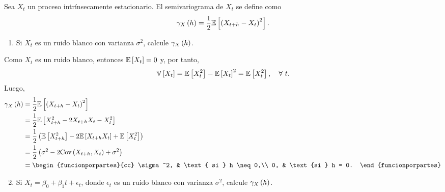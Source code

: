 \documentclass[../main.tex]{subfiles}
\begin{document}
    \begin{enunciado}
    	Sea $X_t$ un proceso intrínsecamente estacionario. El semivariograma de $X_t$ se define como
            \begin{align*}
            	\gamma_X\left( h \right) = \frac 1 2 \mathbb{E} \left[ \left( X_{t+h} - X_t \right)^2 \right].
            \end{align*}
        \begin{enumerate}
        	\item Si $X_t$ es un ruido blanco con varianza $\sigma^2$, calcule $\gamma_X\left( h \right)$.
        \end{enumerate}
    \end{enunciado}
    
    \begin{demostracion}
        Como $X_t$ es un ruido blanco, entonces $\mathbb{E} \left[ X_t \right] = 0$ y, por tanto,
            \begin{align*}
            	\mathbb{V} \left[ X_t \right] = \mathbb{E} \left[ X_t^2 \right] - \mathbb{E} \left[ X_t \right]^2 = \mathbb{E} \left[ X_t^2 \right],\quad \forall\  t.
            \end{align*}
        Luego,
            \begin{align*}
            	\f {\gamma_X} h &= \frac 1 2 \Esp{\pare{X_{t+h} - X_t}^2}\\
            	&= \frac 1 2 \Esp{X_{t+h}^2 - 2 X_{t+h}X_t - X_t^2}\\
            	&= \frac 1 2 \pare{\Esp{X_{t+h}^2} - 2 \Esp{X_{t+h}X_t} + \Esp{X_t^2}}\\
            	&= \frac 1 2 \pare{\sigma^2 - 2 \Cov {X_{t+h},X_t} + \sigma^2}\\
            	&= \begin{funcionporpartes}{cc}
                        \sigma^2, & \text{ si } h \neq 0,\\
                        0, & \text{si } h = 0.
            	   \end{funcionporpartes}
            \end{align*}

    \end{demostracion}
    \vspace{1em}
    \begin{enunciado}
    	\begin{enumerate}
    		\setcounter{enumi}{1}
    		\item Si $X_t = \beta_0 + \beta_1 t + \epsilon_t$, donde $\epsilon_t$ es un ruido blanco con varianza $\sigma^2$, calcule $\gamma_X\left( h \right)$.
    	\end{enumerate}
    \end{enunciado}
    
\end{document}

